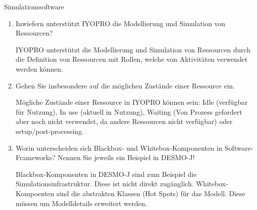 \documentclass{article}
\begin{document}
\begin{exercise}{Simulationssoftware}
\begin{enumerate}
    \item Inwiefern unterstützt IYOPRO die Modellierung und Simulation von Ressourcen?
          \begin{solution}
            IYOPRO unterstützt die Modellierung und Simulation von Ressourcen durch die Definition von Ressourcen mit Rollen, welche von Aktivitäten verwendet werden können.
          \end{solution}

    \item Gehen Sie insbesondere auf die möglichen Zustände einer Ressource ein.
          \begin{solution}
            Mögliche Zustände einer Ressource in IYOPRO können sein: Idle (verfügbar für Nutzung), In use (aktuell in Nutzung), Waiting (Von Prozess gefordert aber noch nicht verwendet, da andere Ressourcen nicht verfügbar) oder setup/post-processing.
          \end{solution}

    \item Worin unterscheiden sich Blackbox- und Whitebox-Komponenten in Software-Frameworks? Nennen Sie jeweils ein Beispiel in DESMO-J!
          \begin{solution}
            Blackbox-Komponenten in DESMO-J sind zum Beispiel die Simulationsinfrastruktur. Diese ist nicht direkt zugänglich. Whitebox-Kompoenten sind die abstrakten Klassen (Hot Spots) für das Modell. Diese müssen um Modelldetails erweitert werden.
          \end{solution}
  \end{enumerate}
\end{exercise}
\end{document}
